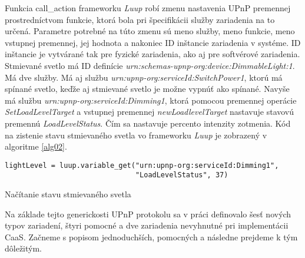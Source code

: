 Funkcia call\_action frameworku \textit{Luup} robí zmenu nastavenia UPnP premennej prostredníctvom funkcie, ktorá bola pri špecifikácii služby zariadenia na to určená. Parametre potrebné na túto zmenu sú meno služby, meno funkcie, meno vstupnej premennej, jej hodnota a nakoniec ID inštancie zariadenia v systéme. ID inštancie je vytvárané tak pre fyzické zariadenia, ako aj pre softvérové zariadenia.\\
\indent Stmievané svetlo má ID definície \textit{urn:schemas-upnp-org:device:DimmableLight:1}. Má dve služby. Má aj službu \textit{urn:upnp-org:serviceId:SwitchPower1}, ktorú má spínané svetlo, keďže aj stmievané svetlo je možne vypnúť ako spínané. Navyše má službu \textit{urn:upnp-org:serviceId:Dimming1}, ktorá pomocou premennej operácie \textit{SetLoadLevelTarget} a vstupnej premennej \textit{newLoadlevelTarget} nastavuje stavovú premennú \textit{LoadLevelStatus}. Čím sa nastavuje percento intenzity zotmenia. Kód na zistenie stavu stmievaného svetla vo frameworku \textit{Luup} je zobrazený v algoritme \ref{alg02}.
\begin{algorithm}
%
\begin{lstlisting}
lightLevel = luup.variable_get("urn:upnp-org:serviceId:Dimming1", 
                               "LoadLevelStatus", 37)

\end{lstlisting}
 \caption{Načítanie stavu stmievaného svetla}
 \label{alg02}
\end{algorithm}
Na základe tejto generickosti UPnP protokolu sa v práci definovalo šesť nových typov zariadení, štyri pomocné a dve zariadenia nevyhnutné pri implementácii CaaS.
Začneme s popisom jednoduchších, pomocných a následne prejdeme k tým dôležitým.
